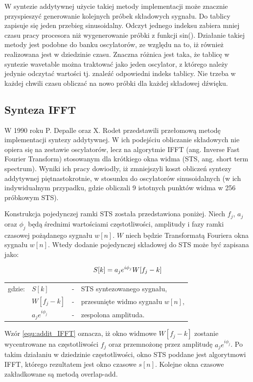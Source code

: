 W syntezie addytywnej użycie takiej metody implementacji może znacznie przyspieszyć generowanie kolejnych próbek składowych sygnału. Do tablicy zapisuje się jeden przebieg sinusoidalny. Odczyt jednego indeksu zabiera mniej czasu pracy procesora niż wygenerowanie próbki z funkcji sin(). Działanie takiej metody jest podobne do banku oscylatorów, ze względu na to, iż również realizowana jest w dziedzinie czasu. Znaczna różnica jest taka, że tablicę w syntezie wavetable można traktować jako jeden oscylator, z którego należy jedynie odczytać wartości tj. znaleźć odpowiedni indeks tablicy. Nie trzeba w każdej chwili czasu obliczać na nowo próbki dla każdej składowej dźwięku.

\subsection{Synteza IFFT}
W 1990 roku P. Depalle oraz X. Rodet przedstawili przełomową metodę implementacji syntezy addytywnej. W ich podejściu obliczanie składowych nie opiera się na zestawie oscylatorów, lecz na algorytmie IFFT (ang. Inverse Fast Fourier Transform) stosowanym dla krótkiego okna widma (STS, ang. short term spectrum). Wyniki ich pracy dowiodły, iż zmniejszyli koszt obliczeń syntezy addytywnej piętnastokrotnie, w stosunku do oscylatorów sinusoidalnych (w ich indywidualnym przypadku, gdzie obliczali 9 istotnych punktów widma w 256 próbkowym STS).

Konstrukcja pojedynczej ramki STS została przedstawiona poniżej. Niech $f_{j}$, $a_{j}$ oraz $\phi_{j}$ będą średnimi wartościami częstotliwości, amplitudy i fazy ramki czasowej pożądanego sygnału $w[n]$. $W$ niech będzie Transformatą Fouriera okna sygnału $w[n]$. Wtedy dodanie pojedynczej składowej do STS może być zapisana jako:

\begin{equation} \label{equ:addit_IFFT}
S[k] = a_{j}e^{i\phi_{j}}W[f_{j} - k] \\  
\end{equation}
\begin{tabular}{ l l l l}
	gdzie: & $S[k]$ &  - & STS syntezowanego sygnału, \\
	& $W[f_{j} - k]$ &  - & przesunięte widmo sygnału $w[n]$, \\
	& $a_{j}e^{i\phi_{j}}$ & - & zespolona amplituda. \\
\end{tabular}

Wzór \ref{equ:addit_IFFT} oznacza, iż okno widmowe $W[f_{j} - k]$ zostanie wycentrowane na częstotliwości $f_{j}$ oraz przemnożonę przez amplitudę $a_{j}e^{i\phi_{j}}$. Po takim działaniu w dziedzinie częstotliwości, okno STS poddane jest algorytmowi IFFT, którego rezultatem jest okno czasowe $s[n]$. Kolejne okna czasowe zakładkowane są metodą overlap-add.

